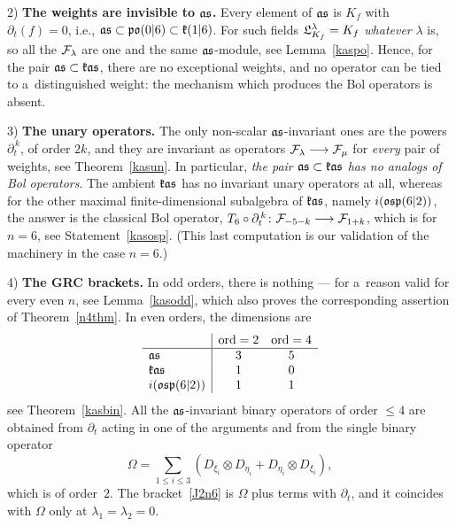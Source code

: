 \documentclass[12pt,a4paper]{amsart}
\theoremstyle{thm}
\theoremstyle{definition}
\newcommand {\tp}{\otimes}
\newcommand {\Nord}{\operatorname{ord}}   %
\begin{document}
2) \textbf{The weights are invisible to ${\mathfrak{as}}$.} Every element of ${\mathfrak{as}}$ is $K_f$
with $\partial_t(f)=0$, i.e., ${\mathfrak{as}}\subset{\mathfrak{po}}(0|6)\subset{\mathfrak{k}}(1|6)$. For such fields
${\mathfrak{L}}^\lambda_{K_f}=K_f$ \textit{whatever} $\lambda$ is, so all the ${\mathcal F}_\lambda$ are one and the
same ${\mathfrak{as}}$-module, see Lemma~\ref{kaspo}. Hence, for the pair ${\mathfrak{as}}\subset{\mathfrak{k}}{\mathfrak{as}}$, there
are no exceptional weights, and no operator can be tied to a~distinguished weight: the
mechanism which produces the Bol operators is absent.

3) \textbf{The unary operators.} The only non-scalar ${\mathfrak{as}}$-invariant ones are the
powers $\partial_t^{\,k}$, of order $2k$, and they are invariant as operators
${\mathcal F}_\lambda\longrightarrow{\mathcal F}_\mu$ for \textit{every} pair of weights, see Theorem~\ref{kasun}. In
particular, \textit{the pair ${\mathfrak{as}}\subset{\mathfrak{k}}{\mathfrak{as}}$ has no analogs of Bol operators}. The ambient
${\mathfrak{k}}{\mathfrak{as}}$ has no invariant unary operators at all, whereas for the other maximal
finite-dimensional subalgebra of ${\mathfrak{k}}{\mathfrak{as}}$, namely $i({\mathfrak{osp}}(6|2))$, the answer is the
classical Bol operator, $T_6\circ\partial_t^{\,k}\colon{\mathcal F}_{-5-k}\longrightarrow{\mathcal F}_{1+k}$, which is
\cite[Thm~1.4.2]{BLS1} for $n=6$, see Statement~\ref{kasosp}. \textup{(}This last computation
is our validation of the machinery in the case $n=6$.\textup{)}

4) \textbf{The GRC brackets.} In odd orders, there is nothing --- for a~reason valid for
every even $n$, see Lemma~\ref{kasodd}, which also proves the corresponding assertion of
Theorem~\ref{n4thm}. In even orders, the dimensions are
\[
\begin{array}{l|ccc}
&\Nord=2&\Nord=4\\
\hline
\fas&3&5\\
\fk\fas&1&0\\
i(\fosp(6|2))&1&1
\end{array}
\]
see Theorem~\ref{kasbin}. All the ${\mathfrak{as}}$-invariant binary operators of order $\leq4$ are obtained from
$\partial_t$ acting in one of the arguments and from the single binary operator
\[
\Omega=\sum_{1\leq i\leq 3}(D_{\xi_i}\tp D_{\eta_i}+D_{\eta_i}\tp D_{\xi_i}),
\]
which is of order~$2$. The bracket~\eqref{J2n6} is $\Omega$ plus terms with $\partial_t$, and it
coincides with $\Omega$ only at $\lambda_1=\lambda_2=0$.
\end{document}
